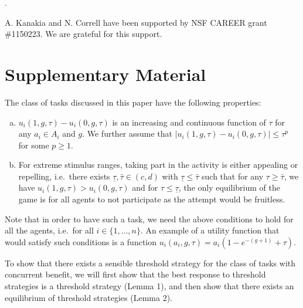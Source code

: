 \documentclass[12pt]{article}
\newcounter{lastnote}
\newenvironment{scilastnote}{%
\setcounter{lastnote}{\value{enumiv}}%
\addtocounter{lastnote}{+1}%
\begin{list}%
{\arabic{lastnote}.}
{\setlength{\leftmargin}{.22in}}
{\setlength{\labelsep}{.5em}}}
{\end{list}}
\begin{document}
\newpage






\begin{scilastnote}
\item A. Kanakia and N. Correll have been supported by NSF CAREER grant \#1150223. We are grateful for this support.
\end{scilastnote}

\newpage
\section*{Supplementary Material}

The class of tasks discussed in this paper have the following properties:
\begin{enumerate}[a.]
	\item $u_i(1,g,\tau)-u_i(0,g,\tau)$ is an increasing and continuous function of $\tau$ for any $a_i\in A_i$ and $g$. We further assume that $|u_i(1,g,\tau)-u_i(0,g,\tau)|\leq \tau^p$ for some $p\geq 1$.
	\item For extreme stimulus ranges, taking part in the activity is either appealing or repelling, i.e.\ there exists $\underline{\tau},\bar{\tau}\in (c,d)$ with $\underline{\tau}\leq \bar{\tau}$ such that for any $\tau\geq \bar{\tau}$, we have $u_i(1,g,\tau)>u_i(0,g,\tau)$ and for $\tau\leq \underline{\tau}$, the only equilibrium of the game is for all agents to not participate as the attempt would be fruitless.
\end{enumerate}
Note that in order to have such a task, we need the above conditions to hold for all the agents, i.e.\ for all $i\in\{1,\ldots,n\}$. An example of a utility function that would satisfy such conditions is a function $u_i(a_i,g,\tau)=a_i(1-e^{-(g+1)}+\tau)$. 

To show that there exists a sensible threshold strategy for the class of tasks with concurrent benefit, we will first show that the best response to threshold strategies is a threshold strategy (Lemma 1), and then show that there exists an equilibrium of threshold strategies\cite{Carlsson1993, Morris2000} (Lemma 2).

\setcounter{lemma}{0}
\end{document}
